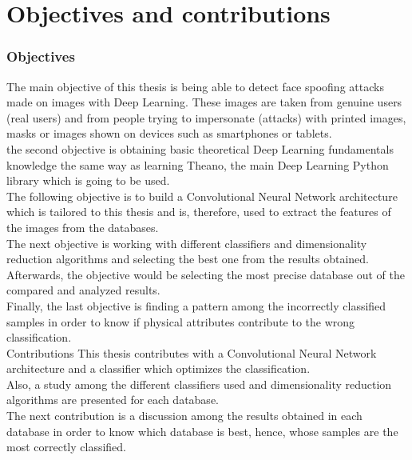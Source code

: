\section{Objectives and contributions}
\subsubsection{Objectives}
The main objective of this thesis is being able to detect face spoofing attacks made on images with Deep Learning. These images are taken from genuine users (real users) and from people trying to impersonate (attacks) with printed images, masks or images shown on devices such as smartphones or tablets.\\

the second objective is obtaining basic theoretical Deep Learning fundamentals knowledge the same way as learning Theano, the main Deep Learning Python library which is going to be used.\\

The following objective is to build a Convolutional Neural Network architecture which is tailored to this thesis and is, therefore, used to extract the features of the images from the databases.\\

The next objective is working with different classifiers and dimensionality reduction algorithms and selecting the best one from the results obtained.\\

Afterwards, the objective would be selecting the most precise database out of the compared and analyzed results.\\

Finally, the last objective is finding a pattern among the incorrectly classified samples in order to know if physical attributes contribute to the wrong classification.\\
Contributions
This thesis contributes with a Convolutional Neural Network architecture and a classifier which optimizes the classification.\\

Also, a study among the different classifiers used and dimensionality reduction algorithms are presented for each database.\\

The next contribution is a discussion among the results obtained in  each database in order to know which database is best, hence, whose samples are the most correctly classified.


